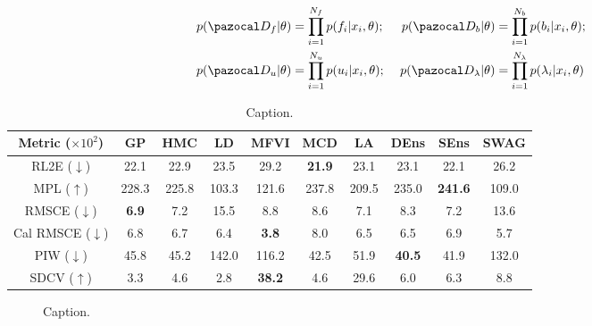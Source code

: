 \documentclass[thnuscript,10pt,number,sort&compress]{elsarticle}
\begin{document}
	\begin{equation}
		\begin{aligned}\label{eq:label}
			p(\cD_f|\theta) & = \prod_{i=1}^{N_f}p(f_i|x_i, \theta) \text{; } & p(\cD_b|\theta) & = \prod_{i=1}^{N_b}p(b_i|x_i, \theta);\\
			p(\cD_u|\theta) & = \prod_{i=1}^{N_u}p(u_i|x_i, \theta) \text{; } & p(\cD_{\lambda}|\theta) & = \prod_{i=1}^{N_{\lambda}}p(\lambda_i|x_i, \theta)
		\end{aligned}
	\end{equation}

	\begin{table}[!ht] %
		\centering
		\footnotesize
		\begin{tabular}{c|ccccccccc}
			\toprule
			Metric ($\times 10^2$)
			& GP & HMC & LD & MFVI & MCD & LA & DEns & SEns & SWAG \\
			\midrule
			RL2E ($\downarrow$) & 22.1 & 22.9 & 23.5 & 29.2 & \textbf{21.9} & 23.1 & 23.1 & 22.1 & 26.2 \\ 
			MPL ($\uparrow$) & 228.3 & 225.8 & 103.3 & 121.6 & 237.8 & 209.5 & 235.0 & \textbf{241.6} & 109.0 \\ 
			RMSCE ($\downarrow$) & \textbf{6.9} & 7.2 & 15.5 & 8.8 & 8.6 & 7.1 & 8.3 & 7.2 & 13.6 \\ 
			\midrule
			Cal RMSCE ($\downarrow$) & 6.8 & 6.7 & 6.4 & \textbf{3.8} & 8.0 & 6.5 & 6.5 & 6.9 & 5.7 \\ 
			PIW ($\downarrow$) & 45.8 & 45.2 & 142.0 & 116.2 & 42.5 & 51.9 & \textbf{40.5} & 41.9 & 132.0 \\ 
			SDCV ($\uparrow$) & 3.3 & 4.6 & 2.8 & \textbf{38.2} & 4.6 & 29.6 & 6.0 & 6.3 & 8.8 \\ 
			\bottomrule
		\end{tabular}
		\caption{
			Caption.
		}
		\label{tab:label}
	\end{table}
	
	\begin{figure}[!ht]
		\centering
		\caption{
			Caption.
		}
		\label{fig:label}
	\end{figure}
\end{document}
